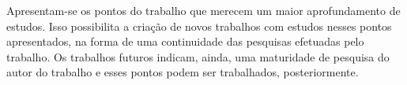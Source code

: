 \documentclass[12pt]{tcc}
\begin{document}
Apresentam-se os pontos do trabalho que merecem um maior aprofundamento de estudos. Isso possibilita a criação de novos trabalhos com estudos nesses pontos apresentados, na forma de uma continuidade das pesquisas efetuadas pelo trabalho. Os trabalhos futuros indicam, ainda, uma maturidade de pesquisa do autor do trabalho e esses pontos podem ser trabalhados, posteriormente.

\label{bibpage}
\renewcommand\bibname{Referências}

%

\label{bibfinalpage}

\label{lastpage}
\end{document}
